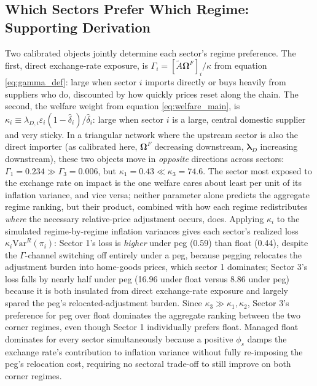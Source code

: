 \documentclass[12pt]{article}
\begin{document}
\subsection{Which Sectors Prefer Which Regime: Supporting Derivation}
\label{app:sector_pref}

Two calibrated objects jointly determine each sector's regime preference. The first, direct
exchange-rate exposure, is $\Gamma_i=[\tilde A\bm\Omega^F]_i/\kappa$ from equation
\eqref{eq:gamma_def}: large when sector $i$ imports directly or buys heavily from suppliers who do,
discounted by how quickly prices reset along the chain. The second, the welfare weight from equation
\eqref{eq:welfare_main}, is $\kappa_i\equiv\lambda_{D,i}\varepsilon_i(1-\hat\delta_i)/\hat\delta_i$:
large when sector $i$ is a large, central domestic supplier and very sticky. In a triangular network
where the upstream sector is also the direct importer (as calibrated here, $\bm\Omega^F$ decreasing
downstream, $\bm\lambda_D$ increasing downstream), these two objects move in \emph{opposite}
directions across sectors: $\Gamma_1=0.234\gg\Gamma_3=0.006$, but $\kappa_1=0.43\ll\kappa_3=74.6$. The
sector most exposed to the exchange rate on impact is the one welfare cares about least per unit of
its inflation variance, and vice versa; neither parameter alone predicts the aggregate regime
ranking, but their product, combined with how each regime redistributes \emph{where} the necessary
relative-price adjustment occurs, does. Applying $\kappa_i$ to the simulated regime-by-regime
inflation variances gives each sector's realized loss $\kappa_i\mathrm{Var}^R(\pi_i)$: Sector 1's loss
is \emph{higher} under peg (0.59) than float (0.44), despite the $\Gamma$-channel switching off
entirely under a peg, because pegging relocates the adjustment burden into home-goods prices, which
sector 1 dominates; Sector 3's loss falls by nearly half under peg (16.96 under float versus 8.86
under peg) because it is both insulated from direct exchange-rate exposure and largely spared the
peg's relocated-adjustment burden. Since $\kappa_3\gg\kappa_1,\kappa_2$, Sector 3's preference for peg
over float dominates the aggregate ranking between the two corner regimes, even though Sector 1
individually prefers float. Managed float dominates for every sector simultaneously because a positive
$\phi_s$ damps the exchange rate's contribution to inflation variance without fully re-imposing the
peg's relocation cost, requiring no sectoral trade-off to still improve on both corner regimes.
\end{document}
